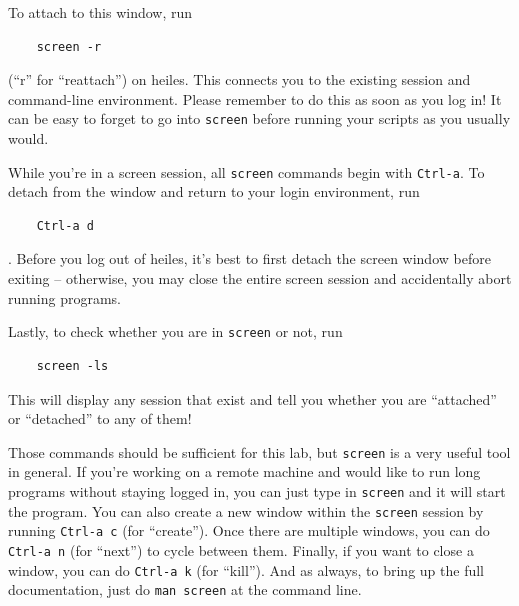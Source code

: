 \documentclass[psfig,preprint]{aastex}
\begin{document}
To attach to this window, run 
\begin{verbatim}
    screen -r
\end{verbatim} 
(``r'' for ``reattach'') on heiles. This connects you to the existing session and command-line environment. Please remember to do this as soon as you log in! It can be easy to forget to go into \texttt{screen} before running your scripts as you usually would.

While you're in a screen session, all \texttt{screen} commands begin with \texttt{Ctrl-a}. To detach from the window and return to your login environment, run
\begin{verbatim}
    Ctrl-a d
\end{verbatim}. 
Before you log out of heiles, it's best to first detach the screen window before exiting -- otherwise, you may close the entire screen session and accidentally abort running programs.

Lastly, to check whether you are in \texttt{screen} or not, run
\begin{verbatim}
    screen -ls
\end{verbatim}
This will display any session that exist and tell you whether you are ``attached'' or ``detached'' to any of them!

Those commands should be sufficient for this lab, but \texttt{screen} is a very useful tool in general. If you're working on a remote machine and would like to run long programs without staying logged in, you can just type in  \texttt{screen} and it will start the program. You can also create a new window within the \texttt{screen} session by running \texttt{Ctrl-a c} (for ``create''). Once there are multiple windows, you can do \texttt{Ctrl-a n} (for ``next'') to cycle between them. Finally, if you want to close a window, you can do \texttt{Ctrl-a k} (for ``kill''). And as always, to bring up the full documentation, just do \texttt{man screen} at the command line.
\end{document}

